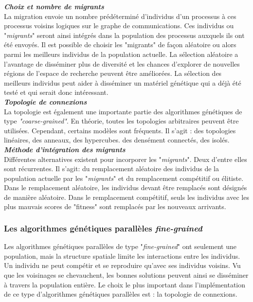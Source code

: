 	\textsl{\textbf{Choix et nombre de migrants}} \\
	La migration envoie un nombre prédéterminé d'individus d'un processus à ces processus voisins logiques sur le graphe de communications. Ces individus ou "\emph{migrants}" seront ainsi intégrés dans la population des processus auxquels ils ont été envoyés. Il est possible de choisir les "migrants" de façon aléatoire ou alors parmi les meilleurs individus de la population actuelle. La sélection aléatoire a l'avantage de disséminer plus de diversité et les chances d'explorer de nouvelles régions de l'espace de recherche peuvent être améliorées. La sélection des meilleurs individus peut aider à disséminer un matériel génétique qui a déjà été testé et qui serait donc intéressant.\\
	
	\textsl{\textbf{Topologie de connexions}}\\
	La topologie est également une importante partie des algorithmes génétiques de type \emph{"coarse-grained"}. En théorie, toutes les topologies arbitraires peuvent être utilisées. Cependant, certains modèles sont fréquents. Il s'agit : des topologies linéaires, des anneaux, des hypercubes. des densément connectés, des isolés.\\
	
	\textsl{\textbf{Méthode d'intégration des migrants}}\\
 	Différentes alternatives existent pour incorporer les "\emph{migrants}". Deux d'entre elles sont récurrentes. Il s'agit: du remplacement aléatoire des individus de la population actuelle par les "\emph{migrants}" et du remplacement compétitif ou élitiste. Dans le remplacement aléatoire, les individus devant être remplacés sont désignés de manière aléatoire. Dans le remplacement compétitif, seuls les individus avec les plus mauvais scores de "fitness" sont remplacés par les nouveaux arrivants.
	
	\subsubsection{Les algorithmes génétiques parallèles \emph{fine-grained}}
	
	Les algorithmes génétiques parallèles de type "\emph{fine-grained}" ont seulement une population, mais la structure spatiale limite les interactions entre les individus. Un individu ne peut compétir et se reproduire qu'avec ses individus voisins. Vu que les voisinages se chevauchent, les bonnes solutions peuvent ainsi se disséminer à travers la population entière. Le choix le plus important dans l'implémentation de ce type d'algorithmes génétiques parallèles est : la topologie de connexions.\\
	
